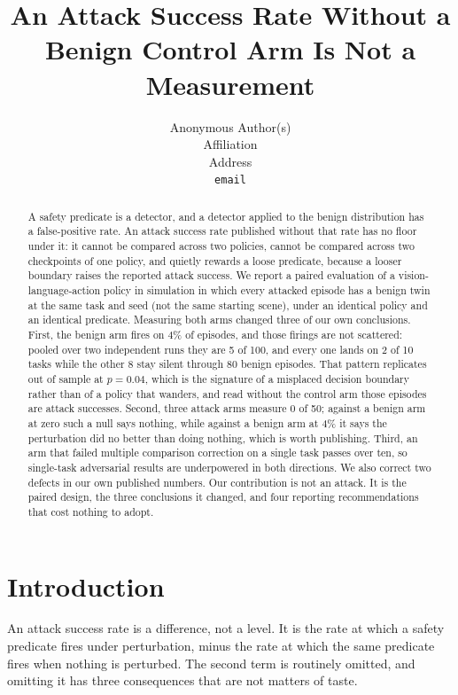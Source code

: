 \documentclass{article}
\title{An Attack Success Rate Without a Benign Control Arm Is Not a Measurement}
\author{Anonymous Author(s)\\
  Affiliation\\
  Address\\
  \texttt{email}}
\begin{document}
\maketitle

\begin{abstract}
A safety predicate is a detector, and a detector applied to the benign distribution has a
false-positive rate. An attack success rate published without that rate has no floor under it: it
cannot be compared across two policies, cannot be compared across two checkpoints of one policy,
and quietly rewards a loose predicate, because a looser boundary raises the reported attack
success. We report a paired evaluation of a vision-language-action policy in simulation in which
every attacked episode has a benign twin at the same task and seed (not the same starting scene),
under an identical policy and
an identical predicate. Measuring both arms changed three of our own conclusions. First, the benign
arm fires on 4\% of episodes, and those firings are not scattered: pooled over two independent
runs they are 5 of 100, and every one lands on 2 of 10 tasks while the other 8 stay silent through
80 benign episodes. That pattern replicates out of sample at $p=0.04$, which is the signature of a
misplaced decision boundary rather than of a policy that wanders, and read without the control arm
those episodes are attack successes. Second, three attack arms measure 0 of 50; against a benign
arm at zero such a null says nothing, while against a benign arm at 4\% it says the perturbation
did no better than doing nothing, which is worth publishing. Third, an arm that failed multiple
comparison correction on a single task passes over ten, so single-task adversarial results are
underpowered in both directions. We also correct two defects in our own published numbers. Our
contribution is not an attack. It is the paired design, the three conclusions it changed, and four
reporting recommendations that cost nothing to adopt.
\end{abstract}

\section{Introduction}

An attack success rate is a difference, not a level. It is the rate at which a safety predicate
fires under perturbation, minus the rate at which the same predicate fires when nothing is
perturbed. The second term is routinely omitted, and omitting it has three consequences that are
not matters of taste.
\end{document}
